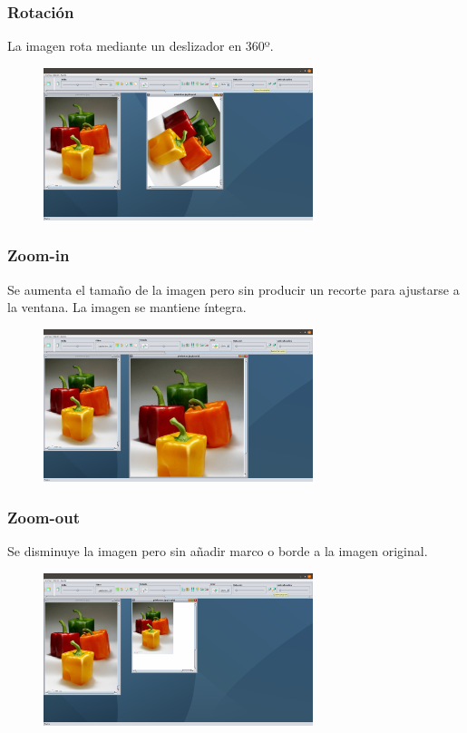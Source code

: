 \documentclass[11pt,a4paper]{article}
\begin{document}
\subsubsection{Rotación}
La imagen rota mediante un deslizador en 360º.

\begin{figure}[H]
\centering
	\includegraphics[width=0.7\textwidth]{img/rotar.png}
\end{figure}

\subsubsection{Zoom-in}
Se aumenta el tamaño de la imagen pero sin producir un recorte para ajustarse a la ventana. La imagen se mantiene íntegra.

\begin{figure}[H]
\centering
	\includegraphics[width=0.7\textwidth]{img/escalamas.png}
\end{figure}

\subsubsection{Zoom-out}
Se disminuye la imagen pero sin añadir marco o borde a la imagen original.

\begin{figure}[H]
\centering
	\includegraphics[width=0.7\textwidth]{img/escalamenos.png}
\end{figure}
\end{document}
